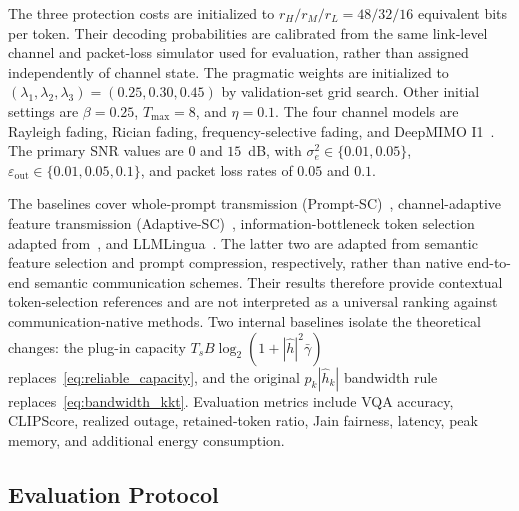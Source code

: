 \documentclass[journal]{IEEEtran}
\begin{document}
The three protection costs are initialized to $r_H/r_M/r_L=48/32/16$ equivalent bits per token. Their decoding probabilities are calibrated from the same link-level channel and packet-loss simulator used for evaluation, rather than assigned independently of channel state. The pragmatic weights are initialized to $(\lambda_1,\lambda_2,\lambda_3)=(0.25,0.30,0.45)$ by validation-set grid search. Other initial settings are $\beta=0.25$, $T_{\max}=8$, and $\eta=0.1$. The four channel models are Rayleigh fading, Rician fading, frequency-selective fading, and DeepMIMO I1~\cite{alkhateeb2019deepmimo}. The primary SNR values are $0$ and $15$~dB, with $\sigma_e^2\in\{0.01,0.05\}$, $\varepsilon_{\mathrm{out}}\in\{0.01,0.05,0.1\}$, and packet loss rates of $0.05$ and $0.1$.

The baselines cover whole-prompt transmission (Prompt-SC)~\cite{ren2025generative}, channel-adaptive feature transmission (Adaptive-SC)~\cite{daiTowardAdaptive}, information-bottleneck token selection adapted from~\cite{shao2021learning}, and LLMLingua~\cite{jiang2023llmlingua}. The latter two are adapted from semantic feature selection and prompt compression, respectively, rather than native end-to-end semantic communication schemes. Their results therefore provide contextual token-selection references and are not interpreted as a universal ranking against communication-native methods. Two internal baselines isolate the theoretical changes: the plug-in capacity $T_sB\log_2(1+|\widehat h|^2\bar\gamma)$ replaces~\eqref{eq:reliable_capacity}, and the original $p_k|\widehat h_k|$ bandwidth rule replaces~\eqref{eq:bandwidth_kkt}. Evaluation metrics include VQA accuracy, CLIPScore, realized outage, retained-token ratio, Jain fairness, latency, peak memory, and additional energy consumption.

\subsection{Evaluation Protocol}
\end{document}
